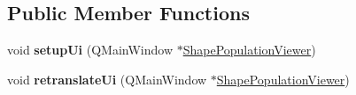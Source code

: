 \subsection*{Public Member Functions}
\begin{DoxyCompactItemize}
\item 
\hypertarget{class_ui___shape_population_viewer_a58ba0c071f45f4e2f676d7e47dadbbb3}{void {\bfseries setup\-Ui} (Q\-Main\-Window $\ast$\hyperlink{class_shape_population_viewer}{Shape\-Population\-Viewer})}\label{class_ui___shape_population_viewer_a58ba0c071f45f4e2f676d7e47dadbbb3}

\item 
\hypertarget{class_ui___shape_population_viewer_aebe98684798a7ccdd7d979f3fde23be2}{void {\bfseries retranslate\-Ui} (Q\-Main\-Window $\ast$\hyperlink{class_shape_population_viewer}{Shape\-Population\-Viewer})}\label{class_ui___shape_population_viewer_aebe98684798a7ccdd7d979f3fde23be2}

\end{DoxyCompactItemize}
